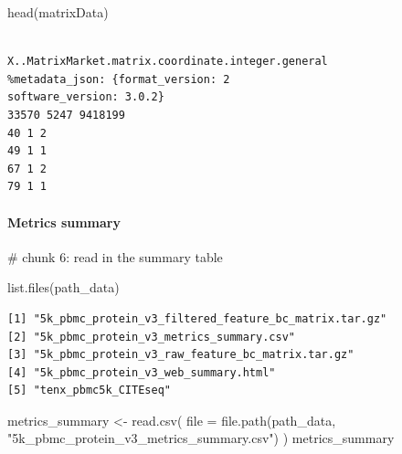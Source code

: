 \documentclass[
  letterpaper,
  DIV=11,
  numbers=noendperiod]{scrartcl}
\let\oldparagraph\paragraph
\renewcommand{\paragraph}[1]{\oldparagraph{#1}\mbox{}}
\newenvironment{Shaded}{\begin{snugshade}}{\end{snugshade}}
\newcommand{\AttributeTok}[1]{\textcolor[rgb]{0.40,0.45,0.13}{#1}}
\newcommand{\CommentTok}[1]{\textcolor[rgb]{0.37,0.37,0.37}{#1}}
\newcommand{\FunctionTok}[1]{\textcolor[rgb]{0.28,0.35,0.67}{#1}}
\newcommand{\NormalTok}[1]{\textcolor[rgb]{0.00,0.23,0.31}{#1}}
\newcommand{\OtherTok}[1]{\textcolor[rgb]{0.00,0.23,0.31}{#1}}
\newcommand{\StringTok}[1]{\textcolor[rgb]{0.13,0.47,0.30}{#1}}
\begin{document}
\begin{Shaded}
\begin{Highlighting}[]
\FunctionTok{head}\NormalTok{(matrixData)}
\end{Highlighting}
\end{Shaded}

\begin{verbatim}
                                   X..MatrixMarket.matrix.coordinate.integer.general
%metadata_json: {format_version: 2                          software_version: 3.0.2}
33570 5247 9418199                                                                  
40 1 2                                                                              
49 1 1                                                                              
67 1 2                                                                              
79 1 1                                                                              
\end{verbatim}

\hypertarget{metrics-summary}{%
\paragraph{Metrics summary}\label{metrics-summary}}

\begin{Shaded}
\begin{Highlighting}[]
\CommentTok{\# chunk 6: read in the summary table}

\FunctionTok{list.files}\NormalTok{(path\_data)}
\end{Highlighting}
\end{Shaded}

\begin{verbatim}
[1] "5k_pbmc_protein_v3_filtered_feature_bc_matrix.tar.gz"
[2] "5k_pbmc_protein_v3_metrics_summary.csv"              
[3] "5k_pbmc_protein_v3_raw_feature_bc_matrix.tar.gz"     
[4] "5k_pbmc_protein_v3_web_summary.html"                 
[5] "tenx_pbmc5k_CITEseq"                                 
\end{verbatim}

\begin{Shaded}
\begin{Highlighting}[]
\NormalTok{metrics\_summary }\OtherTok{\textless{}{-}} \FunctionTok{read.csv}\NormalTok{(}
    \AttributeTok{file =} \FunctionTok{file.path}\NormalTok{(path\_data, }\StringTok{"5k\_pbmc\_protein\_v3\_metrics\_summary.csv"}\NormalTok{)}
\NormalTok{    )}
\NormalTok{metrics\_summary }
\end{Highlighting}
\end{Shaded}
\end{document}
